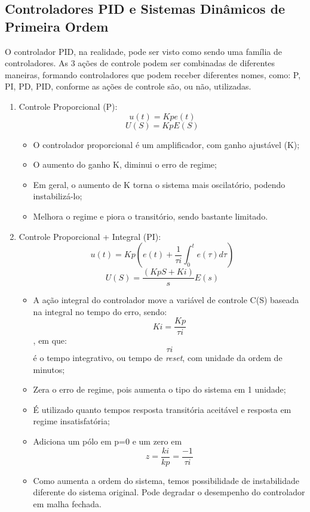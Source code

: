 
\subsection{Controladores PID e Sistemas Dinâmicos de Primeira Ordem}

\hspace{4ex}O controlador PID, na realidade, pode ser visto como sendo uma família de controladores. As 3 ações de controle podem ser combinadas de diferentes maneiras, formando controladores que podem receber diferentes nomes, como: P, PI, PD, PID, conforme as ações de controle são, ou não, utilizadas.

\begin{enumerate}
    \item Controle Proporcional (P):
    \[u(t)=Kpe(t)\] 
    \[U(S)=KpE(S)\]
        \begin{itemize}
            \item O controlador proporcional é um amplificador, com ganho ajustável (K);
            \item O aumento do ganho K, diminui o erro de regime;
            \item Em geral, o aumento de K torna o sistema mais oscilatório, podendo instabilizá-lo;
            \item Melhora o regime e piora o transitório, sendo bastante limitado.
        \end{itemize}
        
    \item Controle Proporcional + Integral (PI):
    \[u(t)=Kp(e(t)+\frac{1}{\tau i}\int_{0}^{t}e(\tau)d\tau)\]
    \[U(S)=\frac{(KpS+Ki)}{s}E(s)\]
        \begin{itemize}
            \item A ação integral do controlador move a variável de controle C(S) baseada na integral no tempo do erro, sendo: \[Ki=\frac{Kp}{\tau i}\], em que: \[\tau i\] é o tempo integrativo, ou tempo de \emph{reset}, com unidade da ordem de minutos;
            \item Zera o erro de regime, pois aumenta o tipo do sistema em 1 unidade;
            \item É utilizado quanto tempos resposta transitória aceitável e resposta em regime insatisfatória;
            \item Adiciona um pólo em p=0 e um zero em \[z=\frac{ki}{kp}=\frac{-1}{\tau i}\]
            \item Como aumenta a ordem do sistema, temos possibilidade de instabilidade diferente do sistema original. Pode degradar o desempenho do controlador em malha fechada.
        \end{itemize}
        

\end{enumerate}
